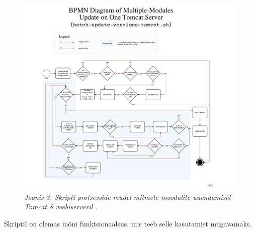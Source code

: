\documentclass[12pt]{report}
\begin{document}
   \begin{figure}[H]
     \begin{center}
       \includegraphics[width=\textwidth]{diagrams/BPMN-diagram-multiple-module-update-tomcat.png}
       \caption*{\textit{Joonis 3. Skripti protsesside mudel mitmete moodulite uuendamisel Tomcat 8 veebiserveril \footnotemark.}}
     \end{center}
   \end{figure}
   
   
   \newpage

  Skriptil on olemas mõni funktsionaalsus, mis teeb selle kasutamist mugavamaks.
  
\end{document}
